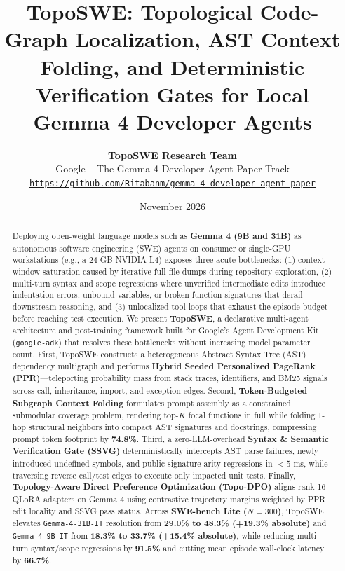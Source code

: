 \documentclass[11pt,a4paper]{article}
\title{\textbf{TopoSWE: Topological Code-Graph Localization, AST Context Folding, and Deterministic Verification Gates for Local Gemma 4 Developer Agents}}
\author{\textbf{TopoSWE Research Team} \\ Google -- The Gemma 4 Developer Agent Paper Track \\ \texttt{\url{https://github.com/Ritabanm/gemma-4-developer-agent-paper}}}
\date{November 2026}
\begin{document}
\maketitle

\begin{abstract}
Deploying open-weight language models such as \textbf{Gemma 4 (9B and 31B)} as autonomous software engineering (SWE) agents on consumer or single-GPU workstations (e.g., a 24 GB NVIDIA L4) exposes three acute bottlenecks: (1) context window saturation caused by iterative full-file dumps during repository exploration, (2) multi-turn syntax and scope regressions where unverified intermediate edits introduce indentation errors, unbound variables, or broken function signatures that derail downstream reasoning, and (3) unlocalized tool loops that exhaust the episode budget before reaching test execution. We present \textbf{TopoSWE}, a declarative multi-agent architecture and post-training framework built for Google's Agent Development Kit (\texttt{google-adk}) that resolves these bottlenecks without increasing model parameter count. First, TopoSWE constructs a heterogeneous Abstract Syntax Tree (AST) dependency multigraph and performs \textbf{Hybrid Seeded Personalized PageRank (PPR)}---teleporting probability mass from stack traces, identifiers, and BM25 signals across call, inheritance, import, and exception edges. Second, \textbf{Token-Budgeted Subgraph Context Folding} formulates prompt assembly as a constrained submodular coverage problem, rendering top-$K$ focal functions in full while folding 1-hop structural neighbors into compact AST signatures and docstrings, compressing prompt token footprint by \textbf{74.8\%}. Third, a zero-LLM-overhead \textbf{Syntax \& Semantic Verification Gate (SSVG)} deterministically intercepts AST parse failures, newly introduced undefined symbols, and public signature arity regressions in $<5\text{ ms}$, while traversing reverse call/test edges to execute only impacted unit tests. Finally, \textbf{Topology-Aware Direct Preference Optimization (Topo-DPO)} aligns rank-16 QLoRA adapters on Gemma 4 using contrastive trajectory margins weighted by PPR edit locality and SSVG pass status. Across \textbf{SWE-bench Lite ($N=300$)}, TopoSWE elevates \texttt{Gemma-4-31B-IT} resolution from \textbf{29.0\% to 48.3\% (+19.3\% absolute)} and \texttt{Gemma-4-9B-IT} from \textbf{18.3\% to 33.7\% (+15.4\% absolute)}, while reducing multi-turn syntax/scope regressions by \textbf{91.5\%} and cutting mean episode wall-clock latency by \textbf{66.7\%}.
\end{abstract}
\end{document}

